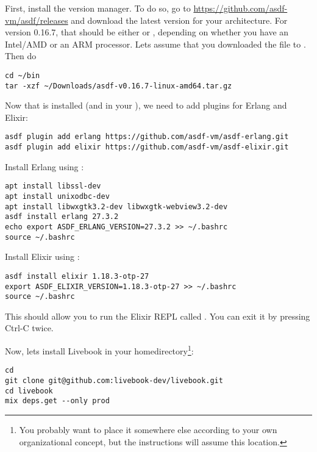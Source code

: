 First, install the  version manager. To do so, go to \url{https://github.com/asdf-vm/asdf/releases} and download the latest version for your architecture. For version 0.16.7, that should be either  or , depending on whether you have an Intel/AMD or an ARM processor. Lets assume that you downloaded the  file to . Then do

\begin{verbatim}
cd ~/bin
tar -xzf ~/Downloads/asdf-v0.16.7-linux-amd64.tar.gz
\end{verbatim}

Now that  is installed (and in your ), we need to add plugins for Erlang and Elixir:

\begin{verbatim}
asdf plugin add erlang https://github.com/asdf-vm/asdf-erlang.git
asdf plugin add elixir https://github.com/asdf-vm/asdf-elixir.git
\end{verbatim}

Install Erlang using :

\begin{verbatim}
apt install libssl-dev
apt install unixodbc-dev
apt install libwxgtk3.2-dev libwxgtk-webview3.2-dev
asdf install erlang 27.3.2
echo export ASDF_ERLANG_VERSION=27.3.2 >> ~/.bashrc
source ~/.bashrc
\end{verbatim}

Install Elixir using :

\begin{verbatim}
asdf install elixir 1.18.3-otp-27
export ASDF_ELIXIR_VERSION=1.18.3-otp-27 >> ~/.bashrc
source ~/.bashrc
\end{verbatim}

This should allow you to run the Elixir REPL called . You can exit it by pressing Ctrl-C twice.

Now, lets install Livebook in your homedirectory\footnote{You probably want to place it somewhere else according to your own organizational concept, but the instructions will assume this location.}:

\begin{verbatim}
cd
git clone git@github.com:livebook-dev/livebook.git
cd livebook
mix deps.get --only prod
\end{verbatim}


